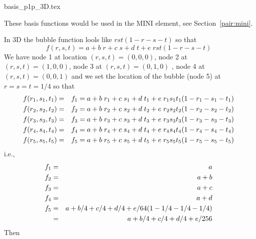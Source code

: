 \begin{flushright} {\tiny {\color{gray} basis\_p1p\_3D.tex}} \end{flushright}

These basis functions would be used in the MINI element, see Section~\ref{pair:mini}.

In 3D the bubble function lools like $rst(1-r-s-t)$ so that 
\[
f(r,s,t)=a+b\; r+c\; s+d\; t+e \; rst(1-r-s-t)
\]
We have node 1 at location $(r,s,t)=(0,0,0)$, node 2 at $(r,s,t)=(1,0,0)$, node 3 at $(r,s,t)=(0,1,0)$ , 
node 4 at $(r,s,t)=(0,0,1)$ and we 
set the location of the bubble (node 5) at $r=s=t=1/4$ so that 
\begin{eqnarray}
f(r_1,s_1,t_1)&=&f_1 = a+b\; r_1+c\; s_1+d\; t_1+e\; r_1s_1t_1(1-r_1-s_1-t_1) \nonumber\\
f(r_2,s_2,t_2)&=&f_2 = a+b\; r_2+c\; s_2+d\; t_2+e\; r_2s_2t_2(1-r_2-s_2-t_2) \nonumber\\
f(r_3,s_3,t_3)&=&f_3 = a+b\; r_3+c\; s_3+d\; t_3+e\; r_3s_3t_3(1-r_3-s_3-t_3) \nonumber\\
f(r_4,s_4,t_4)&=&f_4 = a+b\; r_4+c\; s_4+d\; t_4+e\; r_4s_4t_4(1-r_4-s_4-t_4) \nonumber\\ 
f(r_5,s_5,t_5)&=&f_5 = a+b\; r_5+c\; s_5+d\; t_5+e\; r_5s_5t_5(1-r_5-s_5-t_5) 
\end{eqnarray}
i.e.,
\begin{eqnarray}
f_1 &=& a  \nonumber\\
f_2 &=& a+b \nonumber\\
f_3 &=& a+c \nonumber\\
f_4 &=& a+d \nonumber\\
f_5 &=& a+b/4+c/4+d/4+e/64 (1-1/4-1/4-1/4) \nonumber\\ 
    &=& a+b/4+c/4+d/4+e/256  \nonumber
\end{eqnarray}
Then 

